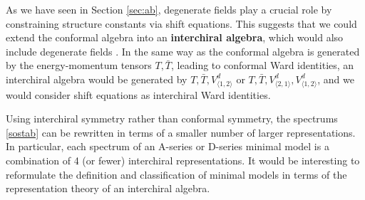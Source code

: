 \documentclass[12pt, a4paper]{article}
\newcommand{\myindex}[1]{\textbf{\boldmath #1}}
\begin{document}
As we have seen in Section \ref{sec:ab}, degenerate fields play a crucial role by constraining structure constants via shift equations. This suggests that we could extend the conformal algebra into an  \myindex{interchiral algebra}, which would also include degenerate fields \cite{grs12}. In the same way as the conformal algebra is generated by the energy-momentum tensors $T,\bar T$, leading to conformal Ward identities, an interchiral algebra would be generated by $T,\bar T,V^d_{\langle 1,2\rangle}$ or $T,\bar T,V^d_{\langle 2,1\rangle},V^d_{\langle 1,2\rangle}$, and we would consider shift equations as interchiral Ward identities.

Using interchiral symmetry rather than conformal symmetry, the spectrums \eqref{sostab} can be rewritten in terms of a smaller number of larger representations. In particular, each spectrum of an A-series or D-series minimal model is a combination of 4 (or fewer) interchiral representations. It would be interesting to reformulate the definition and classification of minimal models in terms of the representation theory of an interchiral algebra.  
\end{document}
